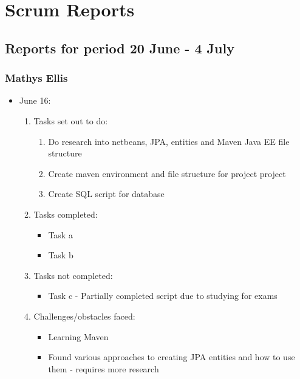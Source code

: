 \section{Scrum Reports}
\subsection{Reports for period 20 June - 4 July}
\subsubsection{Mathys Ellis}
	\begin{itemize}
		\item June 16:
		\begin{enumerate}
			\item Tasks set out to do:
			\begin{enumerate}
				\item Do research into netbeans, JPA, entities and Maven Java EE file structure
				\item Create maven environment and file structure for project project
				\item Create SQL script for database
			\end{enumerate}
			\item Tasks completed:
			\begin{itemize}
				\item Task a
				\item Task b
			\end{itemize}
			\item Tasks not completed:
			\begin{itemize}
				\item Task c - Partially completed script due to studying for exams
			\end{itemize}
			\item Challenges/obstacles faced:
			\begin{itemize}
				\item Learning Maven
				\item Found various approaches to creating JPA entities and how to use them - requires more research
			\end{itemize}			
		\end{enumerate}
	\end{itemize}
	
